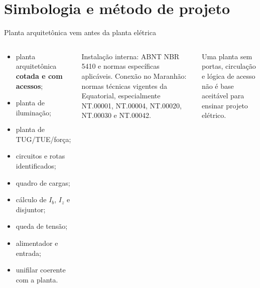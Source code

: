 \newcommand{\IndustrialBase}{%
\draw[line width=1.25pt] (0,0) rectangle (30,20);
\draw[dashed,black!45] (10,0)--(10,20);
\draw[dashed,black!45] (20,0)--(20,20);
\draw[fill=black!4] (0.7,15.3) rectangle (7.0,19.3);
\node[font=\tiny\bfseries] at (3.85,18.85){SALA ELÉTRICA};
\draw[fill=black!4] (23.0,15.3) rectangle (29.3,19.3);
\node[font=\tiny\bfseries] at (26.15,18.85){AUTOMAÇÃO};
\node[font=\tiny\bfseries] at (5,10){ÁREA A};
\node[font=\tiny\bfseries] at (15,10){ÁREA B};
\node[font=\tiny\bfseries] at (25,10){ÁREA C};
\CotaH{0}{10}{20.35}{10 m}\CotaH{10}{20}{20.35}{10 m}\CotaH{20}{30}{20.35}{10 m}
\CotaV{0}{20}{30.35}{20 m}
}

\section{Simbologia e método de projeto}

\begin{frame}[shrink=5]{Planta arquitetônica vem antes da planta elétrica}
\small
\begin{columns}[T,onlytextwidth]
\begin{caixaProjeto}[title=Em cada projeto]
\begin{itemize}
\item planta arquitetônica \textbf{cotada e com acessos};
\item planta de iluminação;
\item planta de TUG/TUE/força;
\item circuitos e rotas identificados;
\item quadro de cargas;
\item cálculo de $I_b$, $I_z$ e disjuntor;
\item queda de tensão;
\item alimentador e entrada;
\item unifilar coerente com a planta.
\end{itemize}
\end{caixaProjeto}
\begin{caixaNorma}[title=Base usada]
Instalação interna: ABNT NBR 5410 e normas específicas aplicáveis. Conexão no Maranhão: normas técnicas vigentes da Equatorial, especialmente NT.00001, NT.00004, NT.00020, NT.00030 e NT.00042.
\end{caixaNorma}
\begin{caixaAt}
Uma planta sem portas, circulação e lógica de acesso não é base aceitável para ensinar projeto elétrico.
\end{caixaAt}
\end{columns}
\end{frame}

